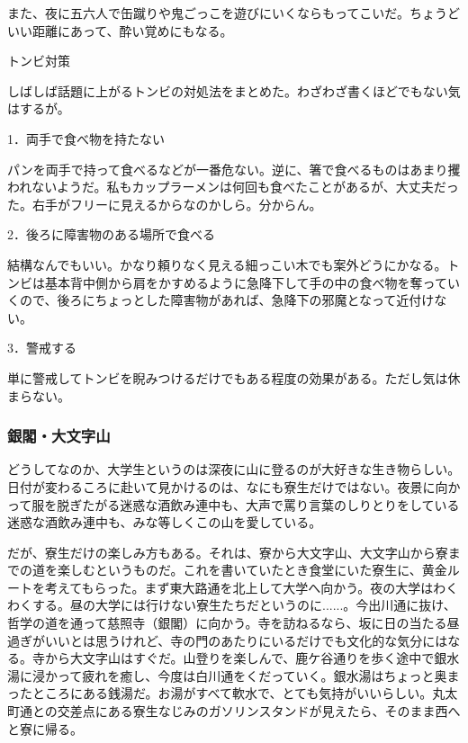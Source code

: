\begin{multicols}{2}
また、夜に五六人で缶蹴りや鬼ごっこを遊びにいくならもってこいだ。ちょうどいい距離にあって、酔い覚めにもなる。



\begin{itembox}[r]{トンビ対策}


	しばしば話題に上がるトンビの対処法をまとめた。わざわざ書くほどでもない気はするが。

	1．両手で食べ物を持たない

	パンを両手で持って食べるなどが一番危ない。逆に、箸で食べるものはあまり攫われないようだ。私もカップラーメンは何回も食べたことがあるが、大丈夫だった。右手がフリーに見えるからなのかしら。分からん。

	2．後ろに障害物のある場所で食べる

	結構なんでもいい。かなり頼りなく見える細っこい木でも案外どうにかなる。トンビは基本背中側から肩をかすめるように急降下して手の中の食べ物を奪っていくので、後ろにちょっとした障害物があれば、急降下の邪魔となって近付けない。
	
	3．警戒する

	単に警戒してトンビを睨みつけるだけでもある程度の効果がある。ただし気は休まらない。


\end{itembox}



\subsubsection{銀閣・大文字山}

\noindent
\scalebox{0.88}{朝★★★★☆昼★★★☆☆夜★★★★★危険度★★★★☆}
\baselineskip
どうしてなのか、大学生というのは深夜に山に登るのが大好きな生き物らしい。日付が変わるころに赴いて見かけるのは、なにも寮生だけではない。夜景に向かって服を脱ぎたがる迷惑な酒飲み連中も、大声で罵り言葉のしりとりをしている迷惑な酒飲み連中も、みな等しくこの山を愛している。

だが、寮生だけの楽しみ方もある。それは、寮から大文字山、大文字山から寮までの道を楽しむというものだ。これを書いていたとき食堂にいた寮生に、黄金ルートを考えてもらった。まず東大路通を北上して大学へ向かう。夜の大学はわくわくする。昼の大学には行けない寮生たちだというのに......。今出川通に抜け、哲学の道を通って慈照寺（銀閣）に向かう。寺を訪ねるなら、坂に日の当たる昼過ぎがいいとは思うけれど、寺の門のあたりにいるだけでも文化的な気分にはなる。寺から大文字山はすぐだ。山登りを楽しんで、鹿ケ谷通りを歩く途中で銀水湯に浸かって疲れを癒し、今度は白川通をくだっていく。銀水湯はちょっと奥まったところにある銭湯だ。お湯がすべて軟水で、とても気持がいいらしい。丸太町通との交差点にある寮生なじみのガソリンスタンドが見えたら、そのまま西へと寮に帰る。


\end{multicols}
